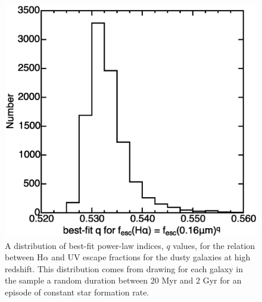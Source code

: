 \documentclass[referee]{aa}
\begin{document}
\begin{figure}[!ht]
\centering
\includegraphics[scale=0.5]{dist_hauv_age.eps}
\caption{A distribution of best-fit power-law indices, $q$ values, for the
relation between H$\alpha$ and UV escape fractions for the dusty galaxies at
high redshift.  This distribution comes from drawing for each galaxy in the
sample a random duration between 20 Myr and 2 Gyr for an episode of constant
star formation rate.\label{distq}}
\end{figure}
\end{document}
